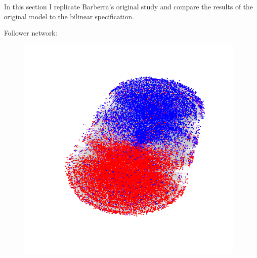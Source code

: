 \documentclass[../template.tex]{subfiles}
\begin{document}
In this section I replicate Barberra's original study and compare the results of the original model to the bilinear specification. 

Follower network:

\begin{figure}[h]
\centering
\includegraphics[scale=.75]{images/follower_net.png}
\end{figure}
\end{document}
